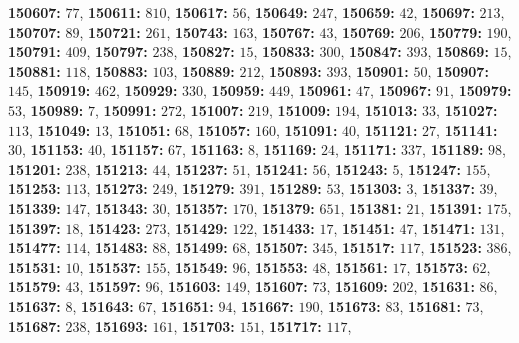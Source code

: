 \textsf{\bfseries 150607:} $77$, \textsf{\bfseries 150611:} $810$, \textsf{\bfseries 150617:} $56$, \textsf{\bfseries 150649:} $247$, \textsf{\bfseries 150659:} $42$, \textsf{\bfseries 150697:} $213$, \textsf{\bfseries 150707:} $89$, \textsf{\bfseries 150721:} $261$, \textsf{\bfseries 150743:} $163$, \textsf{\bfseries 150767:} $43$, \textsf{\bfseries 150769:} $206$, \textsf{\bfseries 150779:} $190$, \textsf{\bfseries 150791:} $409$, \textsf{\bfseries 150797:} $238$, \textsf{\bfseries 150827:} $15$, \textsf{\bfseries 150833:} $300$, \textsf{\bfseries 150847:} $393$, \textsf{\bfseries 150869:} $15$, \textsf{\bfseries 150881:} $118$, \textsf{\bfseries 150883:} $103$, \textsf{\bfseries 150889:} $212$, \textsf{\bfseries 150893:} $393$, \textsf{\bfseries 150901:} $50$, \textsf{\bfseries 150907:} $145$, \textsf{\bfseries 150919:} $462$, \textsf{\bfseries 150929:} $330$, \textsf{\bfseries 150959:} $449$, \textsf{\bfseries 150961:} $47$, \textsf{\bfseries 150967:} $91$, \textsf{\bfseries 150979:} $53$, \textsf{\bfseries 150989:} $7$, \textsf{\bfseries 150991:} $272$, \textsf{\bfseries 151007:} $219$, \textsf{\bfseries 151009:} $194$, \textsf{\bfseries 151013:} $33$, \textsf{\bfseries 151027:} $113$, \textsf{\bfseries 151049:} $13$, \textsf{\bfseries 151051:} $68$, \textsf{\bfseries 151057:} $160$, \textsf{\bfseries 151091:} $40$, \textsf{\bfseries 151121:} $27$, \textsf{\bfseries 151141:} $30$, \textsf{\bfseries 151153:} $40$, \textsf{\bfseries 151157:} $67$, \textsf{\bfseries 151163:} $8$, \textsf{\bfseries 151169:} $24$, \textsf{\bfseries 151171:} $337$, \textsf{\bfseries 151189:} $98$, \textsf{\bfseries 151201:} $238$, \textsf{\bfseries 151213:} $44$, \textsf{\bfseries 151237:} $51$, \textsf{\bfseries 151241:} $56$, \textsf{\bfseries 151243:} $5$, \textsf{\bfseries 151247:} $155$, \textsf{\bfseries 151253:} $113$, \textsf{\bfseries 151273:} $249$, \textsf{\bfseries 151279:} $391$, \textsf{\bfseries 151289:} $53$, \textsf{\bfseries 151303:} $3$, \textsf{\bfseries 151337:} $39$, \textsf{\bfseries 151339:} $147$, \textsf{\bfseries 151343:} $30$, \textsf{\bfseries 151357:} $170$, \textsf{\bfseries 151379:} $651$, \textsf{\bfseries 151381:} $21$, \textsf{\bfseries 151391:} $175$, \textsf{\bfseries 151397:} $18$, \textsf{\bfseries 151423:} $273$, \textsf{\bfseries 151429:} $122$, \textsf{\bfseries 151433:} $17$, \textsf{\bfseries 151451:} $47$, \textsf{\bfseries 151471:} $131$, \textsf{\bfseries 151477:} $114$, \textsf{\bfseries 151483:} $88$, \textsf{\bfseries 151499:} $68$, \textsf{\bfseries 151507:} $345$, \textsf{\bfseries 151517:} $117$, \textsf{\bfseries 151523:} $386$, \textsf{\bfseries 151531:} $10$, \textsf{\bfseries 151537:} $155$, \textsf{\bfseries 151549:} $96$, \textsf{\bfseries 151553:} $48$, \textsf{\bfseries 151561:} $17$, \textsf{\bfseries 151573:} $62$, \textsf{\bfseries 151579:} $43$, \textsf{\bfseries 151597:} $96$, \textsf{\bfseries 151603:} $149$, \textsf{\bfseries 151607:} $73$, \textsf{\bfseries 151609:} $202$, \textsf{\bfseries 151631:} $86$, \textsf{\bfseries 151637:} $8$, \textsf{\bfseries 151643:} $67$, \textsf{\bfseries 151651:} $94$, \textsf{\bfseries 151667:} $190$, \textsf{\bfseries 151673:} $83$, \textsf{\bfseries 151681:} $73$, \textsf{\bfseries 151687:} $238$, \textsf{\bfseries 151693:} $161$, \textsf{\bfseries 151703:} $151$, \textsf{\bfseries 151717:} $117$, 
